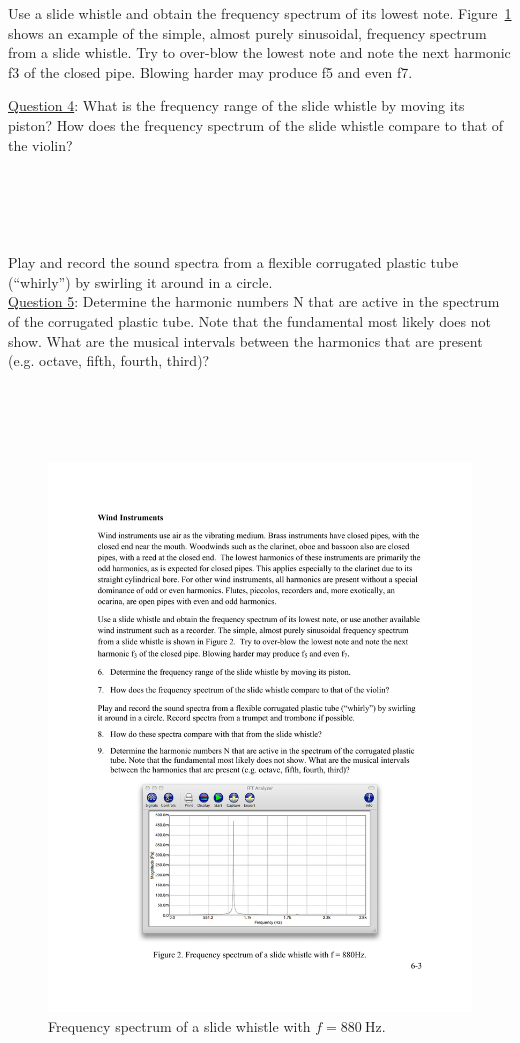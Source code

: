 \documentclass[11pt]{NSF}
\begin{document}
Use a slide whistle and obtain the frequency spectrum of its lowest note.
Figure~\ref{f:2} shows an example of the simple, almost purely sinusoidal, frequency
spectrum from a slide whistle. Try to over-blow the lowest note and note the next
harmonic f3 of the closed pipe. Blowing harder may produce f5 and even f7.

\underline{Question 4}: 
What is the frequency range of the slide whistle by moving its piston?
How does the frequency spectrum of the slide whistle compare to that of the violin? 
\\
\\
\\
\\
\\
\\

Play and record the sound spectra from a flexible corrugated plastic tube (“whirly”) by swirling
it around in a circle. \\

\underline{Question 5}: Determine the harmonic numbers N that are active in the spectrum of the corrugated plastic
tube. Note that the fundamental most likely does not show. What are the musical intervals
between the harmonics that are present (e.g. octave, fifth, fourth, third)?
\\
\\
\\
\\
\\

%
\begin{figure}[hbtp]
\begin{center}
\includegraphics[width=.6\textwidth]{fig6_2}
\caption{Frequency spectrum of a slide whistle with 
$f =880~\textrm{Hz}$.}
\label{f:2}
\end{center}
\end{figure}
\end{document}
